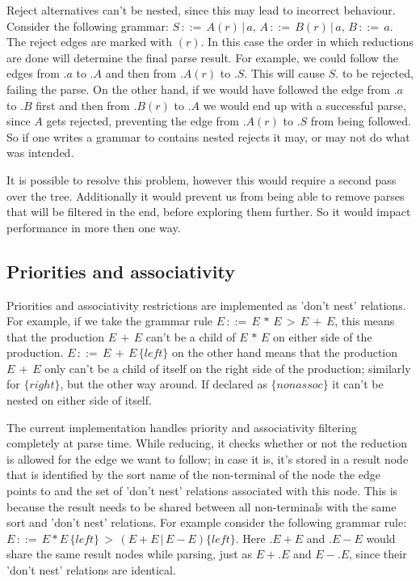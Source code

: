 \documentclass[a4paper,10pt]{article}
\begin{document}
Reject alternatives can't be nested, since this may lead to incorrect behaviour. Consider the following grammar: $S\,::=\,A(r)\,|\,a,\,A\,::=\,B(r)\,|\,a,\,B\,::=\,a$. The reject edges are marked with $(r)$. In this case the order in which reductions are done will determine the final parse result. For example, we could follow the edges from $.a$ to $.A$ and then from $.A(r)$ to $.S$. This will cause $S.$ to be rejected, failing the parse. On the other hand, if we would have followed the edge from $.a$ to $.B$ first and then from $.B(r)$ to $.A$ we would end up with a successful parse, since $A$ gets rejected, preventing the edge from $.A(r)$ to $.S$ from being followed. So if one writes a grammar to contains nested rejects it may, or may not do what was intended.

It is possible to resolve this problem, however this would require a second pass over the tree. Additionally it would prevent us from being able to remove parses that will be filtered in the end, before exploring them further. So it would impact performance in more then one way.

\subsection{Priorities and associativity}

Priorities and associativity restrictions are implemented as 'don't nest' relations. For example, if we take the grammar rule $E\,::=\,E\,*\,E\,>\,E\,+\,E$, this means that the production $E\,+\,E$ can't be a child of $E\,*\,E$ on either side of the production. $E\,::=\,E\,+\,E\,\{left\}$ on the other hand means that the production $E\,+\,E$ only can't be a child of itself on the right side of the production; similarly for $\{right\}$, but the other way around. If declared as $\{nonassoc\}$ it can't be nested on either side of itself.

The current implementation handles priority and associativity filtering completely at parse time. While reducing, it checks whether or not the reduction is allowed for the edge we want to follow; in case it is, it's stored in a result node that is identified by the sort name of the non-terminal of the node the edge points to and the set of 'don't nest' relations associated with this node. This is because the result needs to be shared between all non-terminals with the same sort and 'don't nest' relations. For example consider the following grammar rule: $E\,::=\,E * E\,\{left\}\,>\,(E + E\,|\,E - E)\{left\}$. Here $.E + E$ and $.E - E$ would share the same result nodes while parsing, just as $E+.E$ and $E-.E$, since their 'don't nest' relations are identical.
\end{document}
